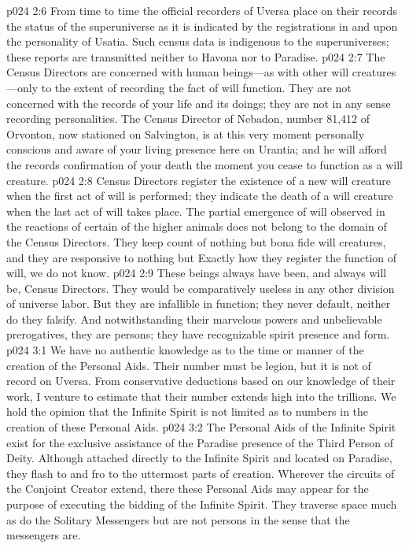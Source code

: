 \vs p024 2:6 From time to time the official recorders of Uversa place on their records the status of the superuniverse as it is indicated by the registrations in and upon the personality of Usatia. Such census data is indigenous to the superuniverses; these reports are transmitted neither to Havona nor to Paradise.
\pc \vs p024 2:7 The Census Directors are concerned with human beings---as with other will creatures---only to the extent of recording the fact of will function. They are not concerned with the records of your life and its doings; they are not in any sense recording personalities. The Census Director of Nebadon, number 81,412 of Orvonton, now stationed on Salvington, is at this very moment personally conscious and aware of your living presence here on Urantia; and he will afford the records confirmation of your death the moment you cease to function as a will creature.
\vs p024 2:8 Census Directors register the existence of a new will creature when the first act of will is performed; they indicate the death of a will creature when the last act of will takes place. The partial emergence of will observed in the reactions of certain of the higher animals does not belong to the domain of the Census Directors. They keep count of nothing but bona fide will creatures, and they are responsive to nothing but  Exactly how they register the function of will, we do not know.
\vs p024 2:9 These beings always have been, and always will be, Census Directors. They would be comparatively useless in any other division of universe labor. But they are infallible in function; they never default, neither do they falsify. And notwithstanding their marvelous powers and unbelievable prerogatives, they are persons; they have recognizable spirit presence and form.
\vs p024 3:1 We have no authentic knowledge as to the time or manner of the creation of the Personal Aids. Their number must be legion, but it is not of record on Uversa. From conservative deductions based on our knowledge of their work, I venture to estimate that their number extends high into the trillions. We hold the opinion that the Infinite Spirit is not limited as to numbers in the creation of these Personal Aids.
\vs p024 3:2 The Personal Aids of the Infinite Spirit exist for the exclusive assistance of the Paradise presence of the Third Person of Deity. Although attached directly to the Infinite Spirit and located on Paradise, they flash to and fro to the uttermost parts of creation. Wherever the circuits of the Conjoint Creator extend, there these Personal Aids may appear for the purpose of executing the bidding of the Infinite Spirit. They traverse space much as do the Solitary Messengers but are not persons in the sense that the messengers are.\plusone
